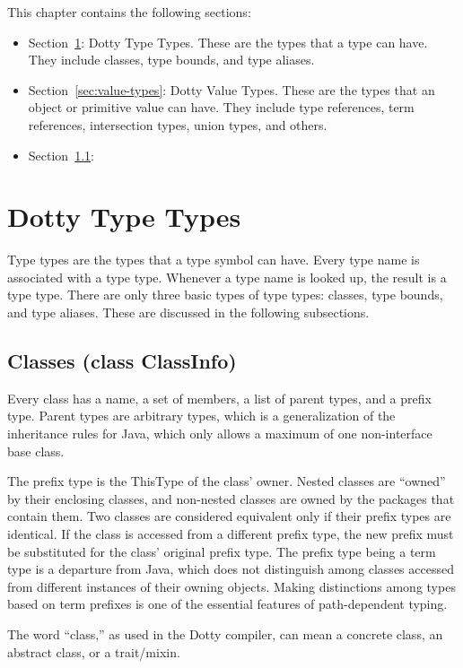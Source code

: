 \documentclass[11pt]{report}
\begin{document}
This chapter contains the following sections:
\begin{itemize}
\item Section~\ref{sec:type-types}: Dotty Type Types. These are the types that a type can have. They include classes, type bounds, and type aliases.
\item Section~\ref{sec:value-types}: Dotty Value Types. These are the types that an object or primitive value can have. They include type references, term references, intersection types, union types, and others.
\item Section~\ref{}:
\end{itemize}


\section{Dotty Type Types} \label{sec:type-types}

Type types are the types that a type symbol can have. Every type name is associated with a type type. Whenever a type name is looked up, the result is a type type.
There are only three basic types of type types: classes, type bounds, and type aliases.
These are discussed in the following subsections.

\subsection{Classes (class ClassInfo)}

Every class has a name, a set of members, a list of parent types, and a prefix type. Parent types are arbitrary types, which is a generalization of the inheritance rules for Java, which only allows a maximum of one non-interface base class.

The prefix type is the ThisType of the class' owner. Nested classes are ``owned'' by their enclosing classes, and non-nested classes are owned by the packages that contain them. Two classes are considered equivalent only if their prefix types are identical. If the class is accessed from a different prefix type, the new prefix must be substituted for the class' original prefix type. The prefix type being a term type is a departure from Java, which does not distinguish among classes accessed from different instances of their owning objects. Making distinctions among types based on term prefixes is one of the essential features of path-dependent typing.

The word ``class,'' as used in the Dotty compiler, can mean a concrete class, an abstract class, or a trait/mixin.
\end{document}
